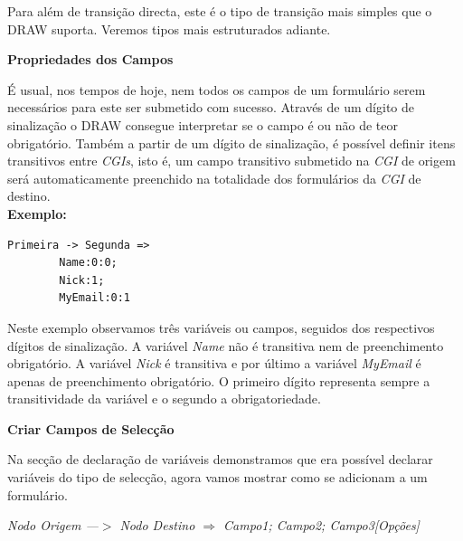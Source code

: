 \documentclass[a4paper]{article}
\begin{document}
\vspace{.2cm}

Para além de transição directa, este é o tipo de transição mais simples que o DRAW suporta. Veremos tipos mais estruturados adiante.\\

\begin{small}
\textbf{Propriedades dos Campos}\\
\end{small}

\hspace{1cm}É usual, nos tempos de hoje, nem todos os campos de um formulário serem necessários para este ser submetido com sucesso.
Através de um dígito de sinalização o DRAW consegue interpretar se o campo é ou não de teor obrigatório. Também a partir de um dígito de
sinalização, é possível definir itens transitivos entre \emph{CGIs}, isto é, um campo transitivo submetido na \emph{CGI} de origem
será automaticamente preenchido na totalidade dos formulários da \emph{CGI} de destino.\\

\textbf{Exemplo:}

\begin{small}
\begin{lstlisting}
Primeira -> Segunda =>
        Name:0:0;
        Nick:1;
        MyEmail:0:1
\end{lstlisting}
\end{small}

\vspace{.2cm}

Neste exemplo observamos três variáveis ou campos, seguidos dos respectivos dígitos de sinalização. A variável \emph{Name} não é
transitiva nem de preenchimento obrigatório. A variável \emph{Nick} é transitiva e por último a variável \emph{MyEmail} é apenas de
preenchimento obrigatório. O primeiro dígito representa sempre a transitividade da variável e o segundo a obrigatoriedade.\\

\begin{small}
\textbf{Criar Campos de Selecção}\\
\end{small}

\hspace{1cm}Na secção de declaração de variáveis demonstramos que era possível declarar variáveis do tipo de selecção, agora vamos
mostrar como se adicionam a um formulário.

\begin{center}
\emph{Nodo Origem —$>$ Nodo Destino $\Rightarrow$
        Campo1;
        Campo2;
        Campo3[Opções]}
\end{center}
\end{document}
